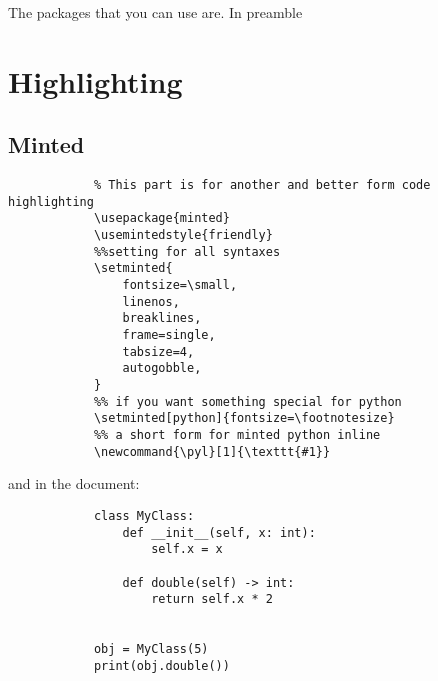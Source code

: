 \documentclass{book}
\newcommand{\pyl}[1]{\texttt{#1}}
\begin{document}
The packages that you can use are. In preamble


\section{Highlighting}
    
    \subsection{Minted}
        \begin{verbatim}
            % This part is for another and better form code highlighting
            \usepackage{minted}
            \usemintedstyle{friendly}
            %%setting for all syntaxes
            \setminted{
                fontsize=\small,
                linenos,
                breaklines,
                frame=single,
                tabsize=4,
                autogobble,
            }
            %% if you want something special for python
            \setminted[python]{fontsize=\footnotesize}
            %% a short form for minted python inline
            \newcommand{\pyl}[1]{\texttt{#1}}
        \end{verbatim}
        and in the document:
        \begin{verbatim}
            class MyClass:
                def __init__(self, x: int):
                    self.x = x
            
                def double(self) -> int:
                    return self.x * 2
            
            
            obj = MyClass(5)
            print(obj.double())
        \end{verbatim}
\end{document}
